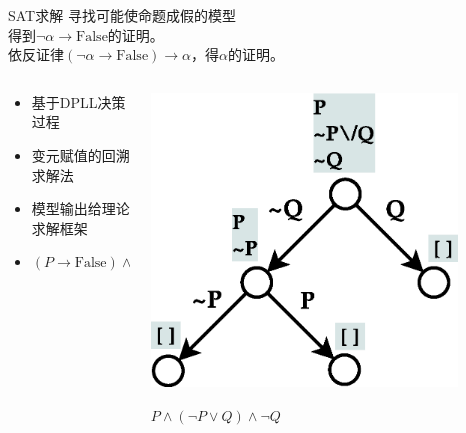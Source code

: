 \documentclass{beamer}
\begin{document}
\begin{frame}[fragile]
  \begin{block}{SAT求解}
    寻找可能使命题成假的模型 \\
    得到$\lnot \alpha \rightarrow \mathrm{False}$的证明。\\
    依反证律$(\lnot \alpha \rightarrow \mathrm{False}) \rightarrow \alpha$，得$\alpha$的证明。
  \end{block}
  \begin{block}{}
    \begin{columns}
      
      \begin{column}{0.6\textwidth}
      
        \begin{itemize}
        \item 基于DPLL决策过程
        \item 变元赋值的回溯求解法
        \item 模型输出给理论求解框架
        \item $(P \rightarrow \mathrm{False}) \land (\lnot P \rightarrow \mathrm{False}) \rightarrow \mathrm{False}$
        \end{itemize}
      \end{column}

      \begin{column}{0.4\textwidth}
        \includegraphics[width=0.85\textwidth]{sat.eps}

        $P \land (\lnot P \lor Q) \land \lnot Q$
      \end{column}

    \end{columns}

  \end{block}
\end{frame}
\end{document}
